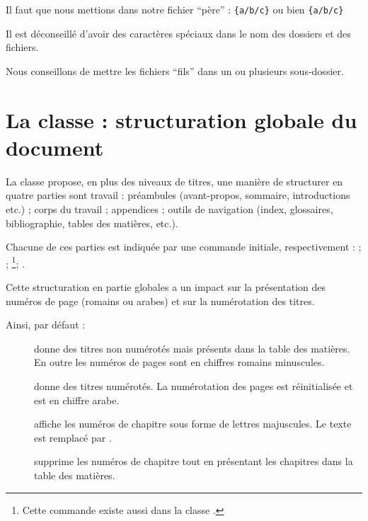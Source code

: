 Il faut que nous mettions dans notre fichier \enquote{père} : \verb|{a/b/c}|
ou bien
\verb|{a/b/c}|

\begin{attention}

Il est déconseillé d'avoir des caractères spéciaux dans le nom des dossiers et des fichiers.
\end{attention}

Nous conseillons de mettre les fichiers \enquote{fils} dans un ou plusieurs sous-dossier.

\section{La classe  : structuration globale du document}\label{sectionbook}

La classe  propose, en plus des niveaux de titres, une manière de structurer en quatre parties sont travail : préambules (avant-propos, sommaire, introductions etc.) ; corps du travail ; appendices ; outils de navigation (index, glossaires, bibliographie, tables des matières,  etc.). 

Chacune de ces parties est indiquée par une commande initiale, respectivement :  ;  ; \footnote{Cette commande existe aussi dans la classe .}; .

Cette structuration en partie globales a un impact sur la présentation des numéros de page (romains ou arabes) et sur la numérotation des titres.

Ainsi, par défaut : \begin{description}
\item[] donne des titres non numérotés mais présents dans la table des matières. En outre les numéros de pages sont en chiffres romains minuscules. 
\item[] donne des titres numérotés. La numérotation des pages est réinitialisée et est en chiffre arabe.
\item[] affiche les numéros de chapitre sous forme de lettres majuscules. Le texte  est remplacé par .
\item[] supprime les numéros de chapitre tout en présentant les chapitres dans la table des matières.
\end{description}

